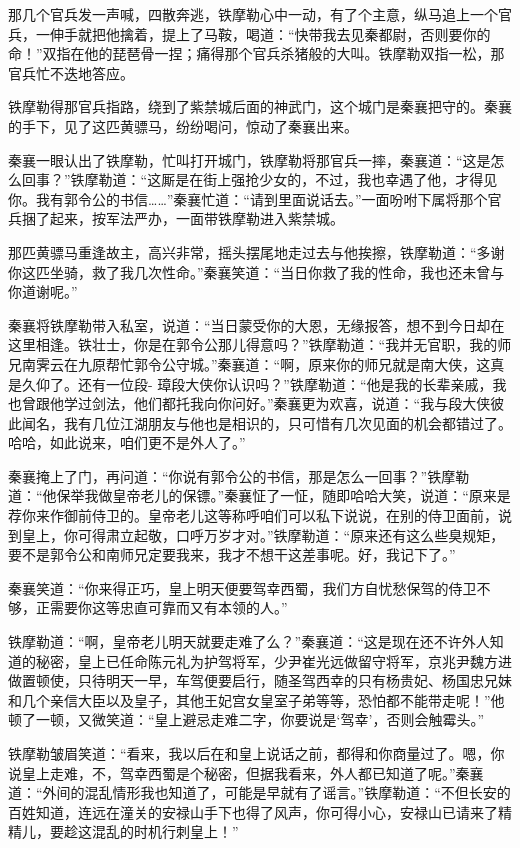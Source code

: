 \documentclass[12pt,oneside]{book}
\begin{document}
那几个官兵发一声喊，四散奔逃，铁摩勒心中一动，有了个主意，纵马追上一个官兵，一伸手就把他擒着，提上了马鞍，喝道：``快带我去见秦都尉，否则要你的命！''双指在他的琵琶骨一捏；痛得那个官兵杀猪般的大叫。铁摩勒双指一松，那官兵忙不迭地答应。

铁摩勒得那官兵指路，绕到了紫禁城后面的神武门，这个城门是秦襄把守的。秦襄的手下，见了这匹黄骠马，纷纷喝问，惊动了秦襄出来。

秦襄一眼认出了铁摩勒，忙叫打开城门，铁摩勒将那官兵一摔，秦襄道：``这是怎么回事？''铁摩勒道：``这厮是在街上强抢少女的，不过，我也幸遇了他，才得见你。我有郭令公的书信\ldots\ldots{}''秦襄忙道：``请到里面说话去。''一面吩咐下属将那个官兵捆了起来，按军法严办，一面带铁摩勒进入紫禁城。

那匹黄骠马重逢故主，高兴非常，摇头摆尾地走过去与他挨擦，铁摩勒道：``多谢你这匹坐骑，救了我几次性命。''秦襄笑道：``当日你救了我的性命，我也还未曾与你道谢呢。''

秦襄将铁摩勒带入私室，说道：``当日蒙受你的大恩，无缘报答，想不到今日却在这里相逢。铁壮士，你是在郭令公那儿得意吗？''铁摩勒道：``我并无官职，我的师兄南霁云在九原帮忙郭令公守城。''秦襄道：``啊，原来你的师兄就是南大侠，这真是久仰了。还有一位段-
璋段大侠你认识吗？''铁摩勒道：``他是我的长辈亲戚，我也曾跟他学过剑法，他们都托我向你问好。''秦襄更为欢喜，说道：``我与段大侠彼此闻名，我有几位江湖朋友与他也是相识的，只可惜有几次见面的机会都错过了。哈哈，如此说来，咱们更不是外人了。''

秦襄掩上了门，再问道：``你说有郭令公的书信，那是怎么一回事？''铁摩勒道：``他保举我做皇帝老儿的保镖。''秦襄怔了一怔，随即哈哈大笑，说道：``原来是荐你来作御前侍卫的。皇帝老儿这等称呼咱们可以私下说说，在别的侍卫面前，说到皇上，你可得肃立起敬，口呼万岁才对。''铁摩勒道：``原来还有这么些臭规矩，要不是郭令公和南师兄定要我来，我才不想干这差事呢。好，我记下了。''

秦襄笑道：``你来得正巧，皇上明天便要驾幸西蜀，我们方自忧愁保驾的侍卫不够，正需要你这等忠直可靠而又有本领的人。''

铁摩勒道：``啊，皇帝老儿明天就要走难了么？''秦襄道：``这是现在还不许外人知道的秘密，皇上已任命陈元礼为护驾将军，少尹崔光远做留守将军，京兆尹魏方进做置顿使，只待明天一早，车驾便要启行，随圣驾西幸的只有杨贵妃、杨国忠兄妹和几个亲信大臣以及皇子，其他王妃宫女皇室子弟等等，恐怕都不能带走呢！''他顿了一顿，又微笑道：``皇上避忌走难二字，你要说是`驾幸'，否则会触霉头。''

铁摩勒皱眉笑道：``看来，我以后在和皇上说话之前，都得和你商量过了。嗯，你说皇上走难，不，驾幸西蜀是个秘密，但据我看来，外人都已知道了呢。''秦襄道：``外间的混乱情形我也知道了，可能是早就有了谣言。''铁摩勒道：``不但长安的百姓知道，连远在潼关的安禄山手下也得了风声，你可得小心，安禄山已请来了精精儿，要趁这混乱的时机行刺皇上！''
\end{document}
